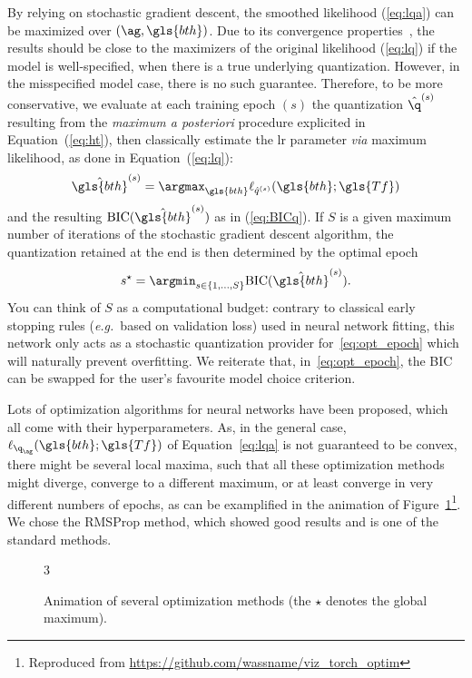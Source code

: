 By relying on stochastic gradient descent, the smoothed likelihood (\ref{eq:lqa}) can be maximized over $\left(\ag, \gls{bth} \right)$. Due to its convergence properties~\cite{bottou2010large}, the results should be close to the maximizers of the original likelihood (\ref{eq:lq}) if the model is well-specified, when there is a true underlying quantization. However, in the misspecified model case, there is no such guarantee. Therefore, to be more conservative, we evaluate at each training epoch $(s)$ the quantization $\hat{\q}^{(s)}$ resulting from the \textit{maximum a posteriori} procedure explicited in Equation~(\ref{eq:ht}), then classically estimate the \gls{lr} parameter \textit{via} maximum likelihood, as done in Equation~(\ref{eq:lq}):
\begin{equation} \label{eq:lr_param_q}
\hat{\gls{bth}}^{(s)} = \argmax_{\gls{bth}} \ell_{\hat{q}^{(s)}}(\gls{bth}; \gls{Tf})
\end{equation}
and the resulting $\mbox{BIC}(\hat{\gls{bth}}^{(s)})$ as in (\ref{eq:BICq}). If $S$ is a given maximum number of iterations of the stochastic gradient descent algorithm, the quantization retained at the end is then determined by the optimal epoch
\begin{equation} \label{eq:opt_epoch}
s^\star=\argmin_{s\in \{1,\ldots, S\}} \mbox{BIC}(\hat{\gls{bth}}^{(s)}).
\end{equation}
You can think of $S$ as a computational budget: contrary to classical early stopping rules (\textit{e.g.}\ based on validation loss) used in neural network fitting, this network only acts as a stochastic quantization provider for~\eqref{eq:opt_epoch} which will naturally prevent overfitting. We reiterate that, in~\eqref{eq:opt_epoch}, the BIC can be swapped for the user's favourite model choice criterion.

Lots of optimization algorithms for neural networks have been proposed, which all come with their hyperparameters. As, in the general case, $\ell_{\q_{\ag}}(\gls{bth} ; \gls{Tf})$ of Equation~\eqref{eq:lqa} is not guaranteed to be convex, there might be several local maxima, such that all these optimization methods might diverge, converge to a different maximum, or at least converge in very different numbers of epochs, as can be examplified in the animation of Figure~\ref{fig:anim_sgd}{\footnote{Reproduced from \url{https://github.com/wassname/viz_torch_optim}}}. We chose the RMSProp method, which showed good results and is one of the standard methods.

\begin{figure}[!ht]
\begin{animateinline}[poster=first, controls=all, palindrome, autopause, autoresume, width=\textwidth]{3}
%
\end{animateinline}
\caption{\label{fig:anim_sgd} Animation of several optimization methods (the $\star$ denotes the global maximum).}
\end{figure}

